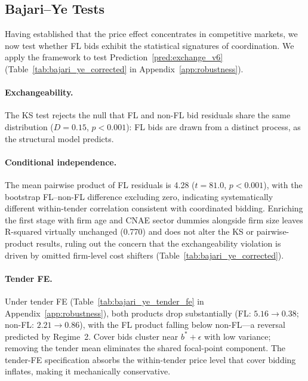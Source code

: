 

\subsection{Bajari--Ye Tests}
\label{sec:results_bajari}

Having established that the price effect concentrates in competitive
markets, we now test whether FL bids exhibit the statistical
signatures of coordination. We apply the \citet{bajari2003deciding}
framework to test
Prediction~\ref{pred:exchange_v6}
(Table~\ref{tab:bajari_ye_corrected} in Appendix~\ref{app:robustness}).

\paragraph{Exchangeability.}
The KS test rejects the null that FL and non-FL bid residuals share
the same distribution ($D = 0.15$, $p < 0.001$): FL bids are drawn
from a distinct process, as the structural model predicts.

\paragraph{Conditional independence.}
The mean pairwise product of FL residuals is 4.28 ($t = 81.0$,
$p < 0.001$), with the bootstrap FL--non-FL difference
excluding zero, indicating systematically different within-tender
correlation consistent with coordinated bidding. Enriching the
first stage with firm age and CNAE sector dummies alongside firm
size leaves R-squared virtually unchanged (0.770) and does not
alter the KS or pairwise-product results, ruling out the concern
that the exchangeability violation is driven by omitted firm-level
cost shifters (Table~\ref{tab:bajari_ye_corrected}).

\paragraph{Tender FE.}
Under tender FE (Table~\ref{tab:bajari_ye_tender_fe} in
Appendix~\ref{app:robustness}), both products drop substantially
(FL: $5.16 \to 0.38$; non-FL: $2.21 \to 0.86$), with the FL product
falling below non-FL---a reversal predicted by Regime~2. Cover bids
cluster near $b^* + \epsilon$ with low variance; removing the tender
mean eliminates the shared focal-point component. The tender-FE
specification absorbs the within-tender price level that cover bidding
inflates, making it mechanically conservative.

